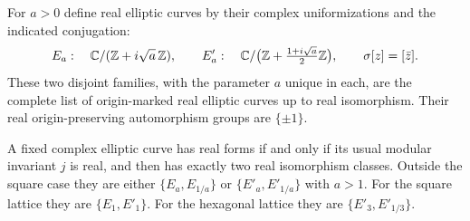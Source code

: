 \begin{theorem}\label{A7-real-classification}
For $a>0$ define real elliptic curves by their complex uniformizations and the indicated conjugation:
\[
 E_a:\quad {\ensuremath{\mathbb{C}}}/({\mathbb{Z}}+i\sqrt a\,{\mathbb{Z}}),\qquad
 E'_a:\quad {\ensuremath{\mathbb{C}}}/\bigl({\mathbb{Z}}+\tfrac{1+i\sqrt a}{2}{\mathbb{Z}}\bigr),
 \qquad \sigma[z]=[\bar{z}].
\]
These two disjoint families, with the parameter $a$ unique in each, are the complete list of origin-marked real elliptic curves up to real isomorphism. Their real origin-preserving automorphism groups are $\{\pm1\}$.

A fixed complex elliptic curve has real forms if and only if its usual modular invariant $j$ is real, and then has exactly two real isomorphism classes. Outside the square case they are either $\{E_a,E_{1/a}\}$ or $\{E'_a,E'_{1/a}\}$ with $a>1$. For the square lattice they are $\{E_1,E'_1\}$. For the hexagonal lattice they are $\{E'_3,E'_{1/3}\}$.
\end{theorem}
